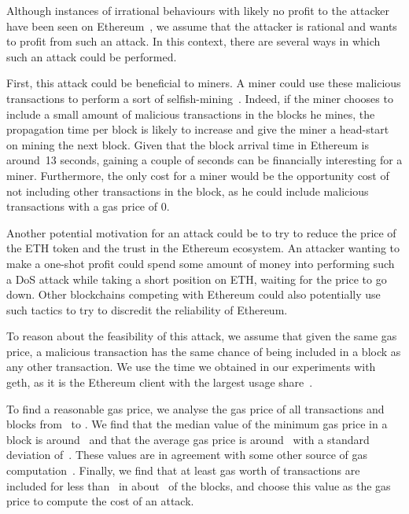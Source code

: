Although instances of irrational behaviours with likely no profit to the attacker have been seen on Ethereum~\cite{Breidenbach}, we assume that the attacker is rational and wants to profit from such an attack. In this context, there are several ways in which such an attack could be performed.

First, this attack could be beneficial to miners. A miner could use these malicious transactions to perform a sort of selfish-mining~\cite{eyal2014majority}. Indeed, if the miner chooses to include a small amount of malicious transactions in the blocks he mines, the propagation time per block is likely to increase and give the miner a head-start on mining the next block. Given that the block arrival time in Ethereum is around~13 seconds, gaining a couple of seconds can be financially interesting for a miner. Furthermore, the only cost for a miner would be the opportunity cost of not including other transactions in the block, as he could include malicious transactions with a gas price of 0.

Another potential motivation for an attack could be to try to reduce the price of the ETH token and the trust in the Ethereum ecosystem. An attacker wanting to make a one-shot profit could spend some amount of money into performing such a DoS attack while taking a short position on ETH, waiting for the price to go down. Other blockchains competing with Ethereum could also potentially use such tactics to try to discredit the reliability of Ethereum.

To reason about the feasibility of this attack, we assume that given the same gas price, a malicious transaction has the same chance of being included in a block as any other transaction. We use the time we obtained in our experiments with geth, as it is the Ethereum client with the largest usage share~\cite{ehternodes}.

To find a reasonable gas price, we analyse the gas price of all transactions and blocks from~ to . We find that the median value of the minimum gas price in a block is around~ and that the average gas price is around~ with a standard deviation of~. These values are in agreement with some other source of gas computation~\cite{eth-gas-station}. Finally, we find that at least  gas worth of transactions are included for less than~ in about~ of the blocks, and choose this value as the gas price to compute the cost of an attack.

